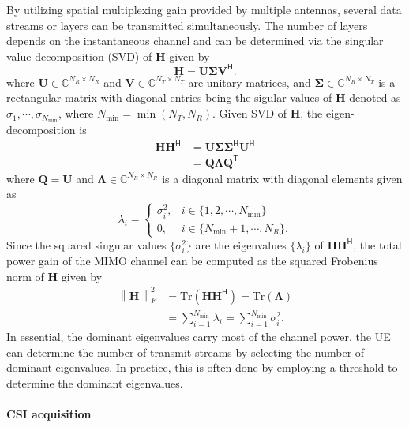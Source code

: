 \documentclass[a4paper,12pt]{article}%
\newcommand{\norm}[1]{\left\lVert#1\right\rVert} %
\begin{document}
By utilizing spatial multiplexing gain provided by multiple antennas, several data streams or layers can be transmitted simultaneously. The number of layers depends on the instantaneous channel and can be determined via the singular value decomposition (SVD) of $\mathbf{H}$ given by
\begin{equation}
\mathbf{H}=\mathbf{U} \boldsymbol{\Sigma} \mathbf{V}^\mathsf{H}.
\end{equation}
where $\mathbf{U} \in \mathbb{C}^{N_R \times N_R}$ and $\mathbf{V} \in \mathbb{C}^{N_T \times N_T}$ are unitary matrices, and $\boldsymbol{\Sigma}\in \mathbb{C}^{N_R \times N_T}$ is a rectangular matrix with diagonal entries being the sigular values of $\mathbf{H}$ denoted as $\sigma_1, \cdots, \sigma_{N_{\min}}$, where $N_{\min}=\min(N_T,N_R).$
Given SVD of $\mathbf{H}$, the eigen-decomposition is
\begin{align}
\mathbf{H}\mathbf{H}^\mathsf{H}&=\mathbf{U}\boldsymbol{\Sigma} \boldsymbol{\Sigma}^\mathsf{H}\mathbf{U}^\mathsf{H} \nonumber \\
&= \mathbf{Q} \boldsymbol{\Lambda} \mathbf{Q}^{\mathsf{T}}
\end{align}
where $\mathbf{Q}=\mathbf{U}$ and $\boldsymbol{\Lambda}\in \mathbb{C}^{N_R\times N_R}$ is a diagonal matrix with diagonal elements given as
\begin{equation}
\lambda_i = \begin{cases} \sigma^2_i, & i\in\{1,2,\cdots,N_{\min}\} \\
0, & i \in \{N_{\min}+1, \cdots, N_R \}.
\end{cases}
\end{equation}
Since the squared singular values $\{\sigma_i^2\}$ are the eigenvalues $\{\lambda_i\}$ of $\mathbf{H}\mathbf{H}^{\mathsf{H}}$, the total power gain of the MIMO channel can be computed as the squared Frobenius norm of $\mathbf{H}$ given by
\begin{align}
\norm{\mathbf{H}}_F^2 &= \text{Tr}(\mathbf{H}\mathbf{H}^\mathsf{H}) = \text{Tr}(\boldsymbol{\Lambda}) \nonumber \\
&= \sum_{i=1}^{N_{\min}} \lambda_i = \sum_{i=1}^{N_{\min}} \sigma_i^2.
\end{align}
In essential, the dominant eigenvalues carry most of the channel power, the UE can determine the number of transmit streams by selecting the number of dominant eigenvalues. In practice, this is often done by employing a threshold to determine the dominant eigenvalues.

\paragraph{CSI acquisition}
\end{document}
